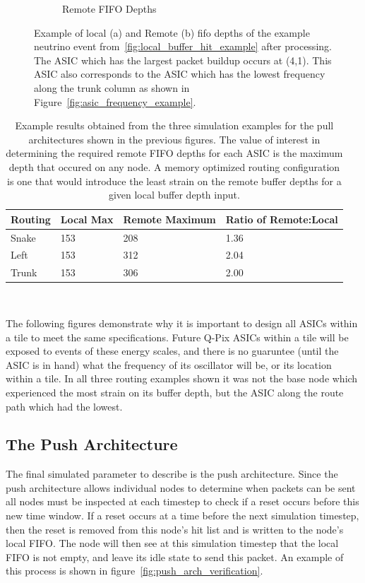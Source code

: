 \begin{figure}
\begin{subfigure}{.5\textwidth}
  \caption{Remote FIFO Depths}
\end{subfigure}
\caption{Example of local (a) and Remote (b) fifo depths of the example neutrino event from~\ref{fig:local_buffer_hit_example} after processing.
The ASIC which has the largest packet buildup occurs at (4,1).
This ASIC also corresponds to the ASIC which has the lowest frequency along the trunk column as shown in Figure~\ref{fig:asic_frequency_example}.
}
\label{fig:trunk_example_neutrino}
\end{figure}


\begin{table}
\begin{center}
\begin{tabular}{|| p{30mm} | p{45mm} | p{45mm} | p{30mm} ||}
 \hline
 Routing & Local Max & Remote Maximum & Ratio of Remote:Local \\ [0.5ex]
 \hline\hline
  Snake & 153 & 208 & 1.36 \\
 \hline
  Left & 153 & 312 & 2.04 \\
 \hline
  Trunk & 153 & 306 & 2.00 \\
 \hline
 \hline
\end{tabular}
\caption{Example results obtained from the three simulation examples for the pull architectures shown in the previous figures.
The value of interest in determining the required remote FIFO depths for each ASIC is the maximum depth that occured on any node.
A memory optimized routing configuration is one that would introduce the least strain on the remote buffer depths for a given local buffer depth input.
}
\end{center}
\end{table}
~\label{table:example_analysis}

The following figures demonstrate why it is important to design all ASICs within a tile to meet the same specifications.
Future Q-Pix ASICs within a tile will be exposed to events of these energy scales, and there is no guaruntee (until the ASIC is in hand) what the frequency of its oscillator will be, or its location within a tile. 
In all three routing examples shown it was not the base node which experienced the most strain on its buffer depth, but the ASIC along the route path which had the lowest.


\subsection{The Push Architecture}

The final simulated parameter to describe is the push architecture.
Since the push architecture allows individual nodes to determine when packets can be sent all nodes must be inspected at each timestep to check if a reset occurs before this new time window.
If a reset occurs at a time before the next simulation timestep, then the reset is removed from this node's hit list and is written to the node's local FIFO.
The node will then see at this simulation timestep that the local FIFO is not empty, and leave its idle state to send this packet.
An example of this process is shown in figure~\ref{fig:push_arch_verification}.

